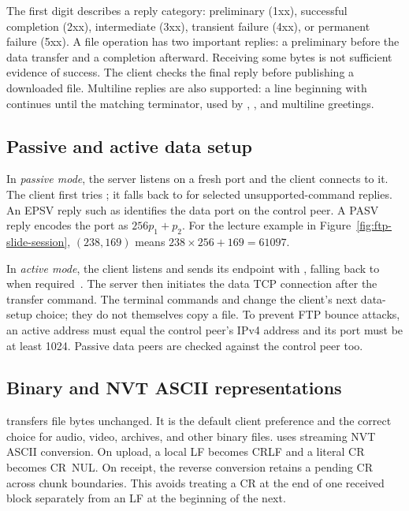 The first digit describes a reply category: preliminary (1xx), successful completion (2xx), intermediate (3xx), transient failure (4xx), or permanent failure (5xx). A file operation has two important replies: a preliminary  before the data transfer and a completion  afterward. Receiving some bytes is not sufficient evidence of success. The client checks the final reply before publishing a downloaded file. Multiline replies are also supported: a line beginning with  continues until the matching  terminator, used by , , and multiline greetings.

\subsection{Passive and active data setup}
In \emph{passive mode}, the server listens on a fresh port and the client connects to it. The client first tries ; it falls back to  for selected unsupported-command replies. An EPSV reply such as  identifies the data port on the control peer. A PASV reply encodes the port as $256p_1+p_2$. For the lecture example in Figure~\ref{fig:ftp-slide-session}, $(238,169)$ means $238\times256+169=61097$.

In \emph{active mode}, the client listens and sends its endpoint with , falling back to  when required~\cite{rfc2428}. The server then initiates the data TCP connection after the transfer command. The terminal commands  and  change the client's next data-setup choice; they do not themselves copy a file. To prevent FTP bounce attacks, an active address must equal the control peer's IPv4 address and its port must be at least 1024. Passive data peers are checked against the control peer too.

\subsection{Binary and NVT ASCII representations}
 transfers file bytes unchanged. It is the default client preference and the correct choice for audio, video, archives, and other binary files.  uses streaming NVT ASCII conversion. On upload, a local LF becomes CRLF and a literal CR becomes CR~NUL. On receipt, the reverse conversion retains a pending CR across chunk boundaries. This avoids treating a CR at the end of one received block separately from an LF at the beginning of the next.

